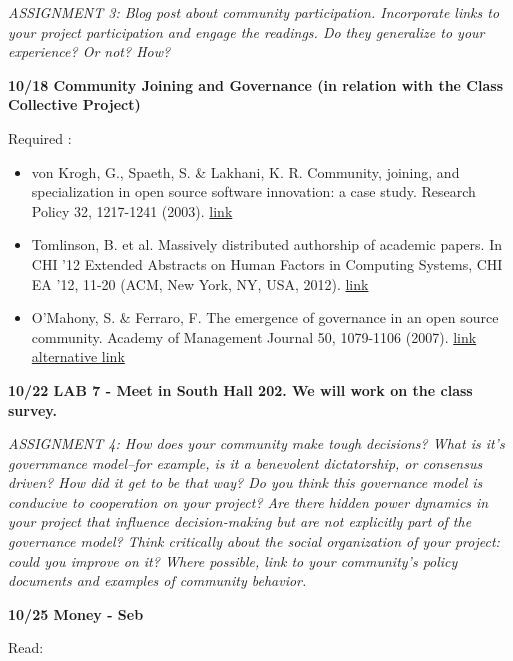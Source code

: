 \emph{ASSIGNMENT 3: Blog post about community participation. Incorporate
links to your project participation and engage the readings. Do they
generalize to your experience? Or not? How?}

\textbf{10/18 Community Joining and Governance (in relation with the
Class Collective Project)}

Required :

\begin{itemize}
\itemsep1pt\parskip0pt
\item
  von Krogh, G., Spaeth, S. \& Lakhani, K. R. Community, joining, and
  specialization in open source software innovation: a case study.
  Research Policy 32, 1217-1241 (2003).
  \href{http://flosshub.org/system/files/rp-vonkroghspaethlakhani.pdf}{link}
\item
  Tomlinson, B. et al. Massively distributed authorship of academic
  papers. In CHI '12 Extended Abstracts on Human Factors in Computing
  Systems, CHI EA '12, 11-20 (ACM, New York, NY, USA, 2012).
  \href{http://dx.doi.org/10.1145/2212776.2212779}{link}
\item
  O'Mahony, S. \& Ferraro, F. The emergence of governance in an open
  source community. Academy of Management Journal 50, 1079-1106 (2007).
  \href{http://dx.doi.org/10.5465/amj.2007.27169153}{link}
  \href{http://www.jstor.org/stable/20159914}{alternative link}
\end{itemize}

\textbf{10/22 LAB 7 - Meet in South Hall 202. We will work on the class
survey.}

\emph{ASSIGNMENT 4: How does your community make tough decisions? What
is it's governmance model--for example, is it a benevolent dictatorship,
or consensus driven? How did it get to be that way? Do you think this
governance model is conducive to cooperation on your project? Are there
hidden power dynamics in your project that influence decision-making but
are not explicitly part of the governance model? Think critically about
the social organization of your project: could you improve on it? Where
possible, link to your community's policy documents and examples of
community behavior.}

\textbf{10/25 Money - Seb}

Read:


